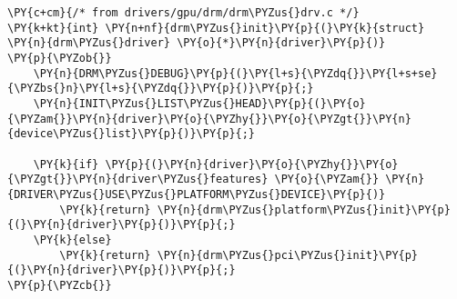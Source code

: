 \begin{Verbatim}[commandchars=\\\{\}]
\PY{c+cm}{/* from drivers/gpu/drm/drm\PYZus{}drv.c */}
\PY{k+kt}{int} \PY{n+nf}{drm\PYZus{}init}\PY{p}{(}\PY{k}{struct} \PY{n}{drm\PYZus{}driver} \PY{o}{*}\PY{n}{driver}\PY{p}{)}
\PY{p}{\PYZob{}}
	\PY{n}{DRM\PYZus{}DEBUG}\PY{p}{(}\PY{l+s}{\PYZdq{}}\PY{l+s+se}{\PYZbs{}n}\PY{l+s}{\PYZdq{}}\PY{p}{)}\PY{p}{;}
	\PY{n}{INIT\PYZus{}LIST\PYZus{}HEAD}\PY{p}{(}\PY{o}{\PYZam{}}\PY{n}{driver}\PY{o}{\PYZhy{}}\PY{o}{\PYZgt{}}\PY{n}{device\PYZus{}list}\PY{p}{)}\PY{p}{;}

	\PY{k}{if} \PY{p}{(}\PY{n}{driver}\PY{o}{\PYZhy{}}\PY{o}{\PYZgt{}}\PY{n}{driver\PYZus{}features} \PY{o}{\PYZam{}} \PY{n}{DRIVER\PYZus{}USE\PYZus{}PLATFORM\PYZus{}DEVICE}\PY{p}{)}
		\PY{k}{return} \PY{n}{drm\PYZus{}platform\PYZus{}init}\PY{p}{(}\PY{n}{driver}\PY{p}{)}\PY{p}{;}
	\PY{k}{else}
		\PY{k}{return} \PY{n}{drm\PYZus{}pci\PYZus{}init}\PY{p}{(}\PY{n}{driver}\PY{p}{)}\PY{p}{;}
\PY{p}{\PYZcb{}}
\end{Verbatim}
